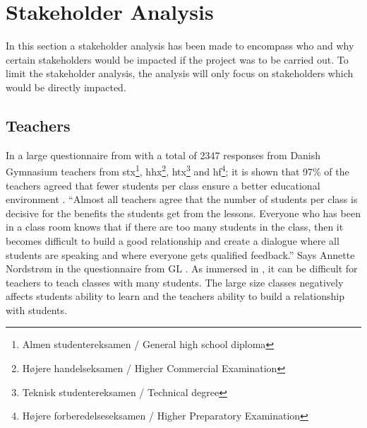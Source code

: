 \section{Stakeholder Analysis} 
\label{sec:stakeholder}
In this section a stakeholder analysis has been made to encompass who and why certain stakeholders would be impacted if the project was to be carried out. To limit the stakeholder analysis, the analysis will only focus on stakeholders which would be directly impacted.

\subsection*{Teachers}
\label{sec:Teachers}
In a large questionnaire from  with a total of 2347 responses from Danish Gymnasium teachers from stx\footnote{Almen studentereksamen / General high school diploma}, hhx\footnote{Højere handelseksamen / Higher Commercial Examination}, htx\footnote{Teknisk studentereksamen / Technical degree} and hf\footnote{Højere forberedelseseksamen / Higher Preparatory Examination}; it is shown that 97\% of the teachers agreed that fewer students per class ensure a better educational environment \cite{Rasmussen2018NyGymnasieskolen}. 
\newline\newline
\enquote{Almost all teachers agree that the number of students per class is decisive for the benefits the students get from the lessons. Everyone who has been in a class room knows that if there are too many students in the class, then it becomes difficult to build a good relationship and create a dialogue where all students are speaking and where everyone gets qualified feedback.} Says Annette Nordstrøm in the questionnaire from GL \cite{Rasmussen2018NyGymnasieskolen}.
\newline\newline
As immersed in , it can be difficult for teachers to teach classes with many students. The large size classes negatively affects students ability to learn and the teachers ability to build a relationship with students.

